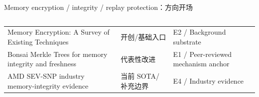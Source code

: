 \begin{frame}[t,shrink=6]{Memory encryption / integrity / replay protection：方向开场}
\begin{columns}[T,totalwidth=\textwidth]
\begin{column}{0.49\textwidth}
{\begin{minipage}[t]{0.97\linewidth}
\begin{minipage}{0.92\linewidth}
{\begin{tabularx}{\linewidth}{@{}YYY@{}}
\midrule
Memory Encryption: A Survey of Existing Techniques & 开创/基础入口 & E2 / Background substrate \\
Bonsai Merkle Trees for memory integrity and freshness & 代表性改进 & E1 / Peer-reviewed mechanism anchor \\
AMD SEV-SNP industry memory-integrity evidence & 当前 SOTA/补充边界 & E4 / Industry evidence \\
\bottomrule
\end{tabularx}
}
    \end{minipage}
    \vspace{1mm}
  \end{minipage}}
  \end{column}
\end{columns}
\end{frame}


